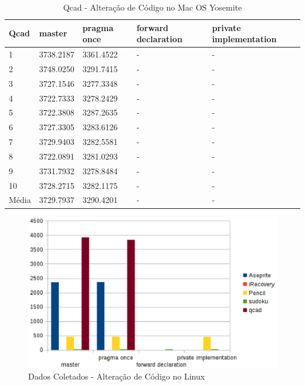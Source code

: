 \begin{table}[!h]
\tiny
\centering
\caption{Qcad - Alteração de Código no Mac OS Yosemite}
\label{tab:alteracao_de_codigo:mac:qcad}
\begin{tabular}{lllll}
\textbf{Qcad} & \textbf{master} & \textbf{pragma once}  & \textbf{forward declaration} & \textbf{private implementation}   \\ \toprule
1                        &   3738.2187      &  3361.4522 &  -   & - \\ 
2                        &   3748.0250      &  3291.7415 &  -   & - \\ 
3                        &   3727.1546      &  3277.3348 &  -   & - \\ 
4                        &   3722.7333      &  3278.2429 &  -   & - \\ 
5                        &   3722.3808      &  3287.2635  &  -   & - \\ 
6                        &   3727.3305      &  3283.6126 &  -   & - \\ 
7                        &   3729.9403      &  3282.5581 &  -   & - \\ 
8                        &   3722.0891      &  3281.0293  &  -   & - \\ 
9                        &   3731.7932      &  3278.8484 &  -   & - \\ 
10                       &   3728.2715      &  3282.1175 &  -   & - \\ \bottomrule
Média                    &   3729.7937      &  3290.4201 &  -   & - \\ 
\end{tabular}
\end{table}

\begin{figure}[b]
    \centering
        \includegraphics{figuras/graficos/linux_alteracao_codigo.eps}
    \caption{Dados Coletados - Alteração de Código no Linux}
    \label{benchmark_guardas_de_inclusao}
\end{figure}

